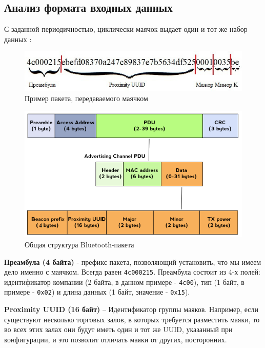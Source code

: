 \subsection{Анализ формата входных данных}

С заданной периодичностью, циклически маячок выдает один и тот же набор данных \cite{web:HabrBig, web:HabrIOS7}:

\begin{figure}[h!]
    \centering
    \includegraphics[width=\textwidth]{img/packageData}
    \caption{Пример пакета, передаваемого маячком}
\end{figure}

\begin{figure}[h!]
    \centering
    \includegraphics[width=\textwidth]{img/packageStructure}
    \caption{Общая структура Bluetooth-пакета}
\end{figure}

\textbf{Преамбула (4 байта)} - префикс пакета, позволяющий установить, что мы имеем дело именно с маячком. Всегда равен \texttt{4c000215}. Преамбула состоит из 4-х полей: идентификатор компании (2 байта, в данном примере - \texttt{4c00}), тип (1 байт, в примере - \texttt{0x02}) и длина данных (1 байт, значение - \texttt{0x15}).

\textbf{Proximity UUID (16 байт)} – Идентификатор группы маяков. Например, если существуют несколько торговых залов, в которых требуется разместить маяки, то во всех этих залах они будут иметь один и тот же UUID, указанный при конфигурации, и это позволит отличать маяки от других, посторонних.

